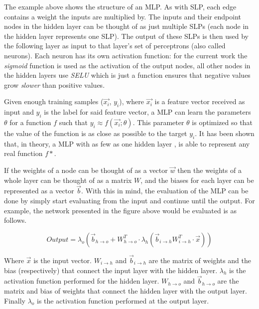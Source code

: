 \documentclass[epsfig,a4paper,11pt,titlepage,twoside,openany]{book}
\begin{document}
The example above shows the structure of an MLP. As with SLP, each edge contains a weight the inputs are multiplied by. The inputs and their endpoint nodes in the hidden layer can be thought of as just multiple SLPs (each node in the hidden layer represents one SLP). The output of these SLPs is then used by the following layer as input to that layer's set of perceptrons (also called neurons). Each neuron has its own activation function: for the current work the \textit{sigmoid} function is used as the activation of the output nodes, all other nodes in the hidden layers use \textit{SELU}  \cite{klambauer2017selfnormalizing} which is just a function ensures that negative values grow \textit{slower} than positive values. 



Given enough training samples ($\vec{x_i}$, $y_i$), where $\vec{x_i}$ is a feature vector received as input and $y_i$ is the label for said feature vector, a MLP can learn the parameters $\theta$ for a function $f$ such that $y_i \approx f(\vec{x_i}; \theta)$. This parameter $\theta$ is optimized so that the value of the function is as close as possible to the target $y_i$. It has been shown \cite{csaji2001approximation} that, in theory, a MLP with as few as one hidden layer \cite{Hornik1991_approximation}, is able to represent any real function $f*$.

If the weights of a node can be thought of as a vector $\vec{w}$ then the weights of a whole layer can be thought of as a matrix $W$, and the biases for each layer can be represented as a vector $\vec{b}$. With this in mind, the evaluation of the MLP can be done by simply start evaluating from the input and continue until the output. For example, the network presented in the figure above would be evaluated is as follows.

\begin{equation*}
    Output = \lambda_{o}(\vec{b}_{h \to o} + W_{h \to o}^T \cdot \lambda_{h}(\vec{b}_{i \to h} W_{i \to h}^T \cdot \vec{x})) 
\end{equation*}

Where $\vec{x}$ is the input vector. $W_{i \to h}$ and $\vec{b}_{i \to h}$ are the matrix of weights and the bias (respectively) that connect the input layer with the hidden layer. $\lambda_{h}$ is the activation function performed for the hidden layer. $W_{h \to o}$ and  $\vec{b}_{h \to o}$ are the matrix and bias of weights that connect the hidden layer with the output layer. Finally $\lambda_{o}$ is the activation function performed at the output layer.
\end{document}
